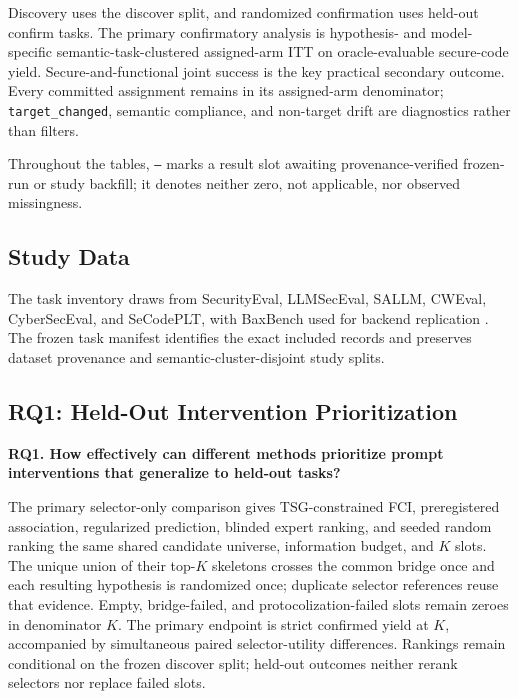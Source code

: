 \documentclass[acmsmall,screen,review,anonymous]{acmart}
\begin{document}
Discovery uses the discover split, and randomized confirmation uses held-out
confirm tasks. The primary confirmatory analysis is hypothesis- and
model-specific semantic-task-clustered assigned-arm ITT on oracle-evaluable
secure-code yield. Secure-and-functional joint success is the key practical
secondary outcome. Every
committed assignment remains in its assigned-arm denominator;
\texttt{target\_changed}, semantic compliance, and non-target drift are
diagnostics rather than filters.

Throughout the tables, \texttt{--} marks a result slot awaiting
provenance-verified frozen-run or study backfill; it denotes neither zero, not
applicable, nor observed missingness.

\subsection{Study Data}

The task inventory draws from SecurityEval, LLMSecEval, SALLM, CWEval,
CyberSecEval, and SeCodePLT, with BaxBench used for backend replication
\cite{siddiq2022securityeval,tony2023llmseceval,siddiq2024sallm,
peng2025cweval,bhatt2023cyberseceval,nie2025secodeplt,vero2025baxbench}.
The frozen task manifest identifies the exact included records and preserves
dataset provenance and semantic-cluster-disjoint study splits.

\subsection{RQ1: Held-Out Intervention Prioritization}

\textbf{RQ1. How effectively can different methods prioritize prompt
interventions that generalize to held-out tasks?}

The primary selector-only comparison gives TSG-constrained FCI,
preregistered association, regularized prediction, blinded expert ranking, and
seeded random ranking the same shared candidate universe, information budget,
and $K$ slots. The unique union of their top-$K$ skeletons crosses the common
bridge once and each resulting hypothesis is randomized once; duplicate
selector references reuse that evidence. Empty, bridge-failed, and
protocolization-failed slots remain zeroes in denominator $K$. The primary
endpoint is strict confirmed yield at $K$, accompanied by simultaneous paired
selector-utility differences. Rankings remain conditional on the frozen
discover split; held-out outcomes neither rerank selectors nor replace failed
slots.
\end{document}
